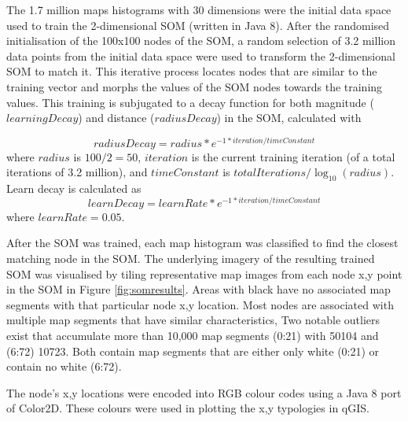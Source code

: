 \documentclass{nature}
\begin{document}
\begin{methods}
The 1.7 million maps histograms with 30 dimensions were the initial data space used to train the 2-dimensional SOM (written in Java 8\cite{Oracle2018}). After the randomised initialisation of the 100x100 nodes of the SOM, a random selection of 3.2 million data points from the initial data space were used to transform the 2-dimensional SOM to match it. This iterative process locates nodes that are similar to the training vector and morphs the values of the SOM nodes towards the training values. This training is subjugated to a decay function for both magnitude ($learningDecay$) and  distance ($radiusDecay$) in the SOM, calculated with


\begin{equation} 
radiusDecay = radius * e^{-1 * iteration / timeConstant}
\end{equation}
where $radius$ is $100/2=50$, $iteration$ is the current training iteration (of a total iterations of 3.2 million), and $timeConstant$ is $totalIterations / \log _{10} (radius)$. Learn decay is calculated as
\begin{equation} 
learnDecay = learnRate * e^{-1 * iteration / timeConstant}
\end{equation}
where $learnRate = 0.05$.

After the SOM was trained, each map histogram was classified to find the closest matching node in the SOM. The underlying imagery of the resulting trained SOM was visualised by tiling representative map images from each node x,y point in the SOM in Figure \ref{fig:somresults}. Areas with black have no associated map segments with that particular node x,y location. Most nodes are associated with multiple map segments that have similar characteristics, %
Two notable outliers exist that accumulate more than 10,000 map segments (0:21) with 50104 and (6:72) 10723. Both contain map segments that are either only white (0:21) or contain no white (6:72).





The node's x,y locations were encoded into RGB colour codes using a Java 8 port of Color2D\cite{Jackle2017,Steiger2015}. These colours were used in plotting the x,y typologies in qGIS\cite{QGIS2009}.









\end{methods}
\end{document}
